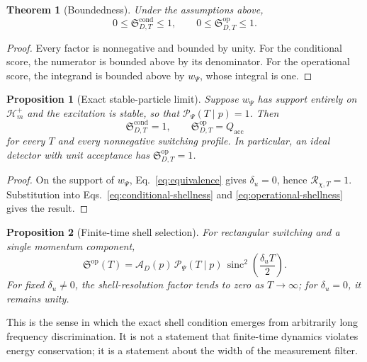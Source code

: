 \documentclass[11pt]{article}
\newtheorem{theorem}{Theorem}
\newtheorem{proposition}{Proposition}
\theoremstyle{remark}
\newcommand{\sinc}{\operatorname{sinc}}
\newcommand{\Sop}{\mathfrak S}
\newcommand{\ShellRes}{\mathcal R}
\newcommand{\Persist}{\mathcal P}
\newcommand{\Access}{\mathcal A}
\begin{document}
\begin{theorem}[Boundedness]
Under the assumptions above,
\begin{equation}
  0\le \Sop^{\mathrm{cond}}_{D,T}\le1,
  \qquad
  0\le \Sop^{\mathrm{op}}_{D,T}\le1.
\end{equation}
\end{theorem}

\begin{proof}
Every factor is nonnegative and bounded by unity. For the conditional score, the numerator is bounded above by its denominator. For the operational score, the integrand is bounded above by $w_\Psi$, whose integral is one.
\end{proof}

\begin{proposition}[Exact stable-particle limit]
Suppose $w_\Psi$ has support entirely on $\mathcal H_m^+$ and the excitation is stable, so that $\Persist_\Psi(T\mid p)=1$. Then
\begin{equation}
  \Sop^{\mathrm{cond}}_{D,T}=1,
  \qquad
  \Sop^{\mathrm{op}}_{D,T}=Q_{\mathrm{acc}}
\end{equation}
for every $T$ and every nonnegative switching profile. In particular, an ideal detector with unit acceptance has $\Sop^{\mathrm{op}}_{D,T}=1$.
\end{proposition}

\begin{proof}
On the support of $w_\Psi$, Eq.~\eqref{eq:equivalence} gives $\delta_u=0$, hence $\ShellRes_{\chi,T}=1$. Substitution into Eqs.~\eqref{eq:conditional-shellness} and \eqref{eq:operational-shellness} gives the result.
\end{proof}

\begin{proposition}[Finite-time shell selection]
For rectangular switching and a single momentum component,
\begin{equation}
  \Sop^{\mathrm{op}}(T)
  =\Access_D(p)\,
  \Persist_\Psi(T\mid p)\,
  \sinc^2\!\left(\frac{\delta_uT}{2}\right).
  \label{eq:single-mode-rect}
\end{equation}
For fixed $\delta_u\neq0$, the shell-resolution factor tends to zero as $T\to\infty$; for $\delta_u=0$, it remains unity.
\end{proposition}

This is the sense in which the exact shell condition emerges from arbitrarily long frequency discrimination. It is not a statement that finite-time dynamics violates energy conservation; it is a statement about the width of the measurement filter.
\end{document}
